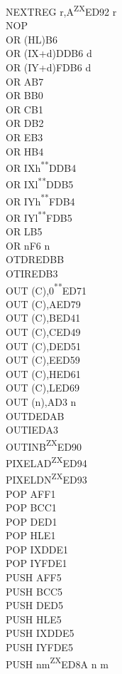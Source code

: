 \documentclass[12pt,twoside,openright,a4paper]{book}
\newcommand{\UNDOC}{\textnormal{\textsuperscript{**}}}
\newcommand{\ZXN}{\textnormal{\textsuperscript{ZX}}}
\begin{document}
\begin{multicols}{3}
{\begin{tabbing}
	NEXTREG r,A\ZXN\>ED92 r\\
	NOP\\
	OR (HL)\>B6\\
	OR (IX+d)\>DDB6 d\\
	OR (IY+d)\>FDB6 d\\
	OR A\>B7\\
	OR B\>B0\\
	OR C\>B1\\
	OR D\>B2\\
	OR E\>B3\\
	OR H\>B4\\
	OR IXh\UNDOC\>DDB4\\
	OR IXl\UNDOC\>DDB5\\
	OR IYh\UNDOC\>FDB4\\
	OR IYl\UNDOC\>FDB5\\
	OR L\>B5\\
	OR n\>F6 n\\
	OTDR\>EDBB\\
	OTIR\>EDB3\\
	OUT (C),0\UNDOC\>ED71\\
	OUT (C),A\>ED79\\
	OUT (C),B\>ED41\\
	OUT (C),C\>ED49\\
	OUT (C),D\>ED51\\
	OUT (C),E\>ED59\\
	OUT (C),H\>ED61\\
	OUT (C),L\>ED69\\
	OUT (n),A\>D3 n\\
	OUTD\>EDAB\\
	OUTI\>EDA3\\
	OUTINB\ZXN\>ED90\\
	PIXELAD\ZXN\>ED94\\
	PIXELDN\ZXN\>ED93\\
	POP AF\>F1\\
	POP BC\>C1\\
	POP DE\>D1\\
	POP HL\>E1\\
	POP IX\>DDE1\\
	POP IY\>FDE1\\
	PUSH AF\>F5\\
	PUSH BC\>C5\\
	PUSH DE\>D5\\
	PUSH HL\>E5\\
	PUSH IX\>DDE5\\
	PUSH IY\>FDE5\\
	PUSH nm\ZXN\>ED8A n m\\

\end{tabbing}}
\end{multicols}
\end{document}
